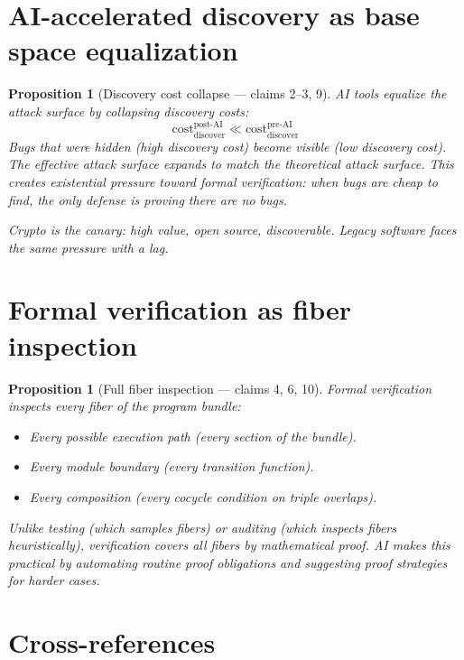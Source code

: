 \documentclass[11pt,a4paper]{article}
\newtheorem{proposition}[definition]{Proposition}
\begin{document}
\section{AI-accelerated discovery as base space equalization}

\begin{proposition}[Discovery cost collapse --- claims 2--3, 9]
\label{prop:discovery}
AI tools equalize the attack surface by collapsing discovery costs:
\[
  \text{cost}_{\text{discover}}^{\text{post-AI}} \ll
    \text{cost}_{\text{discover}}^{\text{pre-AI}}
\]
Bugs that were hidden (high discovery cost) become visible (low
discovery cost). The effective attack surface expands to match the
theoretical attack surface. This creates existential pressure toward
formal verification: when bugs are cheap to find, the only defense is
proving there are no bugs.

Crypto is the canary: high value, open source, discoverable. Legacy
software faces the same pressure with a lag.
\end{proposition}

\section{Formal verification as fiber inspection}

\begin{proposition}[Full fiber inspection --- claims 4, 6, 10]
\label{prop:verification}
Formal verification inspects every fiber of the program bundle:
\begin{itemize}
  \item Every possible execution path (every section of the bundle).
  \item Every module boundary (every transition function).
  \item Every composition (every cocycle condition on triple overlaps).
\end{itemize}
Unlike testing (which samples fibers) or auditing (which inspects fibers
heuristically), verification covers \emph{all} fibers by mathematical
proof. AI makes this practical by automating routine proof obligations
and suggesting proof strategies for harder cases.
\end{proposition}


\section{Cross-references}
\end{document}
